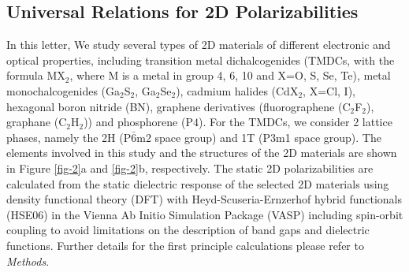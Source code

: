 \documentclass[journal=ancac3,manuscript=article,email=true,hyperref=true,keywords=false]{achemso}
\begin{document}
\subsection{Universal Relations for 2D Polarizabilities}
\label{sec:first-principles}

In this letter, We study several types of 2D materials of different
electronic and optical properties, including transition metal
dichalcogenides (TMDCs, with the formula MX\(_{\text{2}}\), where M is
a metal in group 4, 6, 10 and X=O, S, Se, Te), metal monochalcogenides
(Ga$_{2}$S$_{2}$, Ga$_{2}$Se$_{2}$), cadmium halides (CdX$_2$, X=Cl,
I), hexagonal boron nitride (BN), graphene derivatives (fluorographene
(C$_{2}$F$_{2}$), graphane (C$_{2}$H$_{2}$)) and phosphorene (P$4$).
For the TMDCs, we consider 2 lattice phases, namely the 2H
(P\(\bar{6}\)m2 space group) and 1T (P3m1 space group).  The elements
involved in this study and the structures of the 2D materials are
shown in Figure \ref{fig-2}a and \ref{fig-2}b, respectively. The
static 2D polarizabilities are calculated from the static dielectric
response of the selected 2D materials using density functional theory
(DFT) with Heyd-Scuseria-Ernzerhof hybrid functionals (HSE06) in the
Vienna Ab Initio Simulation Package (VASP) including spin-orbit
coupling to avoid limitations on the description of band gaps and
dielectric functions. Further details for the first principle
calculations please refer to \textit{Methods}.
\end{document}
